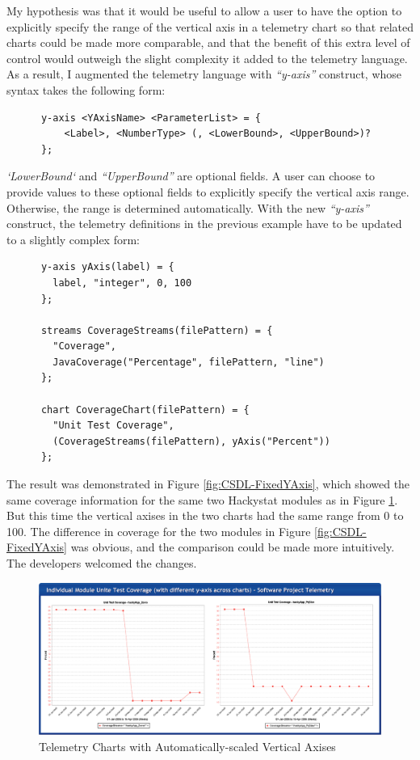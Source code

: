 My hypothesis was that it would be useful to allow a user to have the option to explicitly specify the range of the vertical axis in a telemetry chart so that related charts could be made more comparable, and that the benefit of this extra level of control would outweigh the slight complexity it added to the telemetry language. As a result, I augmented the telemetry language with \textit{``y-axis''} construct, whose syntax takes the following form:

\begin{verbatim}
      y-axis <YAxisName> <ParameterList> = { 
          <Label>, <NumberType> (, <LowerBound>, <UpperBound>)?
      };
\end{verbatim}

\textit{`LowerBound`} and \textit{``UpperBound''} are optional fields. A user can choose to provide values to these optional fields to explicitly specify the vertical axis range. Otherwise, the range is determined automatically. With the new \textit{``y-axis''} construct, the telemetry definitions in the previous example have to be updated to a slightly complex form:

\begin{verbatim}
      y-axis yAxis(label) = {
        label, "integer", 0, 100
      };

      streams CoverageStreams(filePattern) = {
        "Coverage",
        JavaCoverage("Percentage", filePattern, "line")
      };

      chart CoverageChart(filePattern) = {
        "Unit Test Coverage",
        (CoverageStreams(filePattern), yAxis("Percent"))
      };
\end{verbatim}

The result was demonstrated in Figure \ref{fig:CSDL-FixedYAxis}, which showed the same coverage information for the same two Hackystat modules as in Figure \ref{fig:CSDL-AutoYAxis}. But this time the vertical axises in the two charts had the same range from 0 to 100. The difference in coverage for the two modules in Figure \ref{fig:CSDL-FixedYAxis} was obvious, and the comparison could be made more intuitively. The developers welcomed the changes.

\begin{figure}[p]
  \center
  \includegraphics[width=1.00\textwidth]{figures/CSDL-AutoYAxis}
  \caption{Telemetry Charts with Automatically-scaled Vertical Axises} 
  \label{fig:CSDL-AutoYAxis}
\end{figure}

